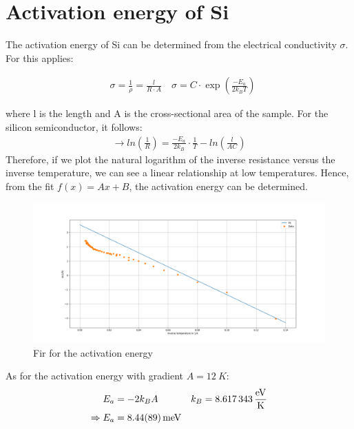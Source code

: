 
\section{Activation energy of Si}
The activation energy of Si can be determined from the electrical conductivity $\sigma$. For this applies:

\begin{align}
    &\sigma = \frac{1}{\rho} = \frac{l}{R\cdot A} \
    &\sigma = C\cdot \exp \left (\frac{-E_a}{2k_BT} \right ) 
\end{align}

where l is the length and A is the cross-sectional area of the sample. For the silicon semiconductor, it follows:
\begin{align}
    \rightarrow ln\left( \frac{1}{R}\right ) = \frac{-E_a}{2k_B} \cdot \frac{1}{T} -ln \left ( \frac{l}{AC} \right )
\end{align}
Therefore, if we plot the natural logarithm of the inverse resistance versus the inverse temperature, we can see a linear relationship at low temperatures. Hence, from the fit $f(x) = Ax+B $, the activation energy can be determined. 
\begin{figure}
    \centering
    \includegraphics{./fig/ex4.png}
    \caption{Fir for the activation energy}
    \label{fig:ex4}
\end{figure}
As for the activation energy with gradient $A = \SI{12}{K}$:
\begin{align}
    E_a &= -2k_BA &k_B = \SI{8,617343}{\frac{eV}{K}} \\
    \Rightarrow E_a &= \SI{8,44\pm 0,89}{meV}
\end{align}